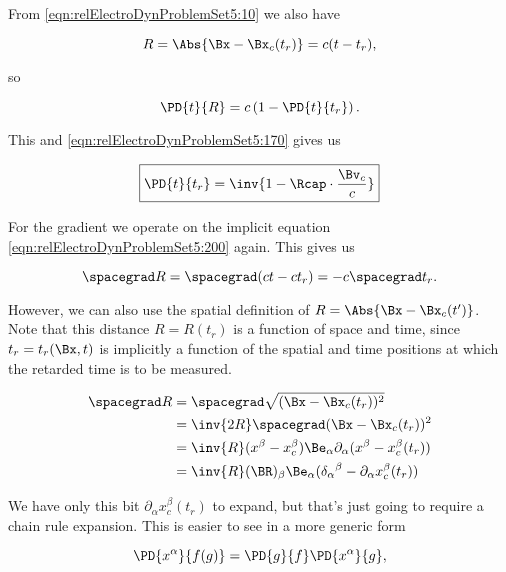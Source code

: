 From \ref{eqn:relElectroDynProblemSet5:10} we also have

\begin{equation}\label{eqn:relElectroDynProblemSet5:200}
R = \Abs{\Bx - \Bx_c(t_r)} = c(t - t_r),
\end{equation}

so 

\begin{equation}\label{eqn:relElectroDynProblemSet5:220}
\PD{t}{R} = c\left(1 - \PD{t}{t_r}\right).
\end{equation}

This and \ref{eqn:relElectroDynProblemSet5:170} gives us

\begin{equation}\label{eqn:relElectroDynProblemSet5:240}
\boxed{
\PD{t}{t_r} = \inv{ 1 -\Rcap \cdot \frac{\Bv_c}{c} }
}
\end{equation}

For the gradient we operate on the implicit equation \ref{eqn:relElectroDynProblemSet5:200} again.  This gives us

\begin{equation}\label{eqn:relElectroDynProblemSet5:300}
\spacegrad R = \spacegrad (c t - c t_r) = - c \spacegrad t_r.
\end{equation}

However, we can also use the spatial definition of $R = \Abs{\Bx - \Bx_c(t')}$.  Note that this distance $R = R(t_r)$ is a function of space and time, since $t_r = t_r(\Bx, t)$ is implicitly a function of the spatial and time positions at which the retarded time is to be measured.

\begin{align*}
\spacegrad R 
&=
\spacegrad \sqrt{(\Bx - \Bx_c(t_r))^2} \\
&=
\inv{2R} \spacegrad (\Bx - \Bx_c(t_r))^2 \\
&=
\inv{R} (x^\beta - x_c^\beta) \Be_\alpha \partial_\alpha (x^\beta - x_c^\beta(t_r)) \\
&=
\inv{R} (\BR)_\beta \Be_\alpha ({\delta_\alpha}^\beta - \partial_\alpha x_c^\beta(t_r)) \\
\end{align*}

We have only this bit $\partial_\alpha x_c^\beta(t_r)$ to expand, but that's just going to require a chain rule expansion.  This is easier to see in a more generic form

\begin{equation}\label{eqn:relElectroDynProblemSet5:320}
\PD{x^\alpha}{f(g)} = \PD{g}{f} \PD{x^\alpha}{g},
\end{equation}

